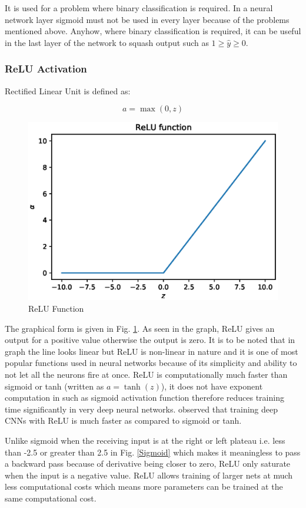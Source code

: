 \documentclass[11pt]{article}
\begin{document}
It is used for a problem where binary classification is required. In a neural network layer sigmoid must not be used in every layer because of the problems mentioned above. Anyhow, where binary classification is required, it can be useful in the last layer of the network to squash output such as $ 1 \geq \hat{y} \geq 0$.

\subsubsection{ReLU Activation}
Rectified Linear Unit is defined as:

\begin{equation}
a = \max (0, z)
\end{equation}


\begin{figure}[ht!]
	\centering
	\includegraphics[width=.6\linewidth]{files/cnn_architecture/relu.eps}
	\caption{ReLU Function}
	\label{relu}
\end{figure}

The graphical form is given in Fig. \ref{relu}. As seen in the graph, ReLU gives an output for a positive value otherwise the output is zero. It is to be noted that in graph the line looks linear but ReLU is non-linear in nature and it is one of most popular functions used in neural networks because of its simplicity and ability to not let all the neurons fire at once. ReLU is computationally much faster than sigmoid or tanh (written as $a=\tanh (z)$), it does not have exponent computation in such as sigmoid activation function therefore reduces training time significantly in very deep neural networks. \cite{krizhevsky2012imagenet} observed that training deep CNNs with ReLU is much faster as compared to sigmoid or tanh.

Unlike sigmoid when the receiving input is at the right or left plateau i.e. less than -2.5 or greater than 2.5 in Fig. \ref{Sigmoid} which makes it meaningless to pass a backward pass because of derivative being closer to zero, ReLU only saturate when the input is a negative value. ReLU allows training of larger nets at much less computational costs which means more parameters can be trained at the same computational cost.
\end{document}
